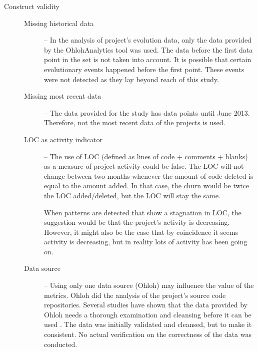 \begin{description}
	\item[Construct validity] \hfill
	
	\begin{description}
		\item[\rm{Missing historical data}] -- In the analysis of project's
			evolution data, only the data provided by the OhlohAnalytics tool was used.
			The data before the first data point in the set is not taken into account. It
			is possible that certain evolutionary events happened before the first point.
			These events were not detected as they lay beyond reach of this study.

		\item[\rm{Missing most recent data}] -- The data provided for the study has
			data points until June 2013. Therefore, not the most recent data of the
			projects is used.

		\item[\rm{LOC as activity indicator}] -- The use of LOC (defined as
			lines of code + comments + blanks) as a measure of project activity could be
			false. The LOC will not change between two months whenever the amount of code
			deleted is equal to the amount added. In that case, the churn would be twice
			the LOC added/deleted, but the LOC will stay the same.

			When patterns are detected that show a stagnation in LOC, the suggestion
			would be that the project's activity is decreasing. However, it might also
			be the case that by coincidence it seems activity is decreasing, but in
			reality lots of activity has been going on.

		\item[\rm{Data source}] -- Using only one data source (Ohloh) may
			influence the value of the metrics. Ohloh did the analysis of the project's
			source code repositories. Several studies have shown that the data provided
			by Ohloh needs a thorough examination and cleansing before it can be used
			\cite{bruntink2013, ohlohanalytics, bruntink2014}. The data was initially
			validated and cleansed, but to make it consistent. No actual verification on
			the correctness of the data was conducted.

	\begin{comment}
			Additionally, the data set of projects is a sample taken from all projects
			tracked by Ohloh. What is unclear is if the set of projects tracked by Ohloh
			is a representation of the world of OSS projects. Selecting a data set that
			is representative to the projects tracked by Ohloh does not automatically be
			representative to the world.


\end{comment}
\end{description}
\end{description}
